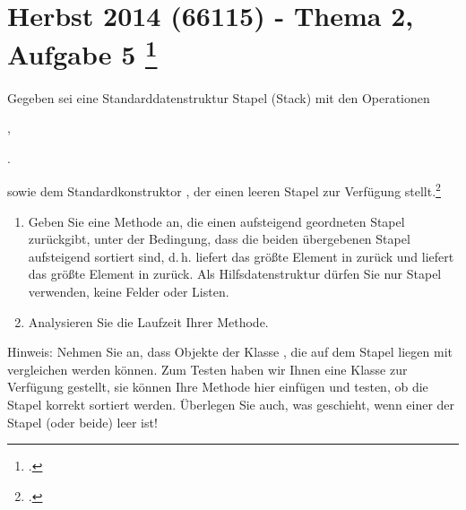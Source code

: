 \documentclass{lehramt-informatik-minimal}
\begin{document}
\section{Herbst 2014 (66115) - Thema 2, Aufgabe 5
\footcite[Herbst 2014 (66115) - Thema 2, Aufgabe 5, Seite 5]{examen:66115:2014:09}}

Gegeben sei eine Standarddatenstruktur Stapel (Stack) mit den Operationen

\begin{compactitem}
\item {}
\item {},
\item {}.
\end{compactitem}

sowie dem Standardkonstruktor , der einen leeren Stapel
zur Verfügung stellt.\footcite[Seite 2-3, Aufgabe 5]{aud:ab:4}

\begin{enumerate}


\item Geben Sie eine Methode  an,
die einen aufsteigend geordneten Stapel zurückgibt, unter der Bedingung,
dass die beiden übergebenen Stapel aufsteigend sortiert sind, d.\,h.
 liefert das größte Element in  zurück und
 liefert das größte Element in  zurück. Als
Hilfsdatenstruktur dürfen Sie nur Stapel verwenden, keine Felder oder
Listen.

\begin{antwort}
\end{antwort}


\item Analysieren Sie die Laufzeit Ihrer Methode.

\end{enumerate}

\noindent
Hinweis: Nehmen Sie an, dass Objekte der Klasse , die auf
dem Stapel liegen mit  vergleichen werden können. Zum
Testen haben wir Ihnen eine Klasse  zur Verfügung
gestellt, sie können Ihre Methode hier einfügen und testen, ob die
Stapel korrekt sortiert werden. Überlegen Sie auch, was geschieht, wenn
einer der Stapel (oder beide) leer ist!
\end{document}
